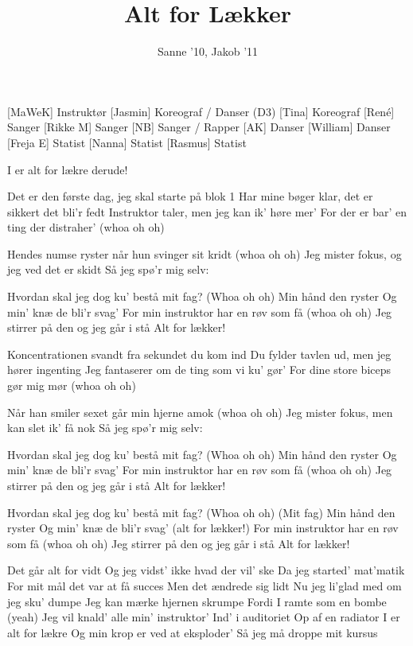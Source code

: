 \documentclass[a4paper,11pt]{article}
\title{Alt for Lækker}
\author{Sanne '10, Jakob '11}
\begin{document}
\maketitle

\begin{roles}
[MaWeK] Instruktør
[Jasmin] Koreograf / Danser (D3)
[Tina] Koreograf
[René] Sanger
[Rikke M] Sanger
[NB] Sanger / Rapper
[AK] Danser
[William] Danser
[Freja E] Statist
[Nanna] Statist
[Rasmus] Statist
\end{roles}

\begin{song}
 I er alt for lækre derude!

 Det er den første dag, jeg skal starte på blok 1
Har mine bøger klar, det er sikkert det bli'r fedt
Instruktor taler, men jeg kan ik' høre mer'
For der er bar' en ting der distraher' (whoa oh oh)

 Hendes numse ryster når hun svinger sit kridt (whoa oh oh)
Jeg mister fokus, og jeg ved det er skidt
Så jeg spø'r mig selv:

 Hvordan skal jeg dog ku' bestå mit fag? (Whoa oh oh)
Min hånd den ryster
Og min' knæ de bli'r svag'
For min instruktor har en røv som få (whoa oh oh)
Jeg stirrer på den og jeg går i stå
 Alt for lækker!

 Koncentrationen svandt fra sekundet du kom ind
Du fylder tavlen ud, men jeg hører ingenting
Jeg fantaserer om de ting som vi ku' gør'
For dine store biceps gør mig mør (whoa oh oh)

 Når han smiler sexet går min hjerne amok (whoa oh oh)
Jeg mister fokus, men kan slet ik' få nok
Så jeg spø'r mig selv:

 Hvordan skal jeg dog ku' bestå mit fag? (Whoa oh oh)
Min hånd den ryster
Og min' knæ de bli'r svag'
For min instruktor har en røv som få (whoa oh oh)
Jeg stirrer på den og jeg går i stå
 Alt for lækker!

 Hvordan skal jeg dog ku' bestå mit fag? (Whoa oh oh)
 (Mit fag)
 Min hånd den ryster
Og min' knæ de bli'r svag' (alt for lækker!)
For min instruktor har en røv som få (whoa oh oh)
Jeg stirrer på den og jeg går i stå
Alt for lækker!

 Det går alt for vidt
Og jeg vidst' ikke hvad der vil' ske
Da jeg started' mat'matik
For mit mål det var at få succes
Men det ændrede sig lidt
Nu jeg li'glad med om jeg sku' dumpe
Jeg kan mærke hjernen skrumpe
Fordi I ramte som en bombe (yeah)
Jeg vil knald' alle min' instruktor'
Ind' i auditoriet
Op af en radiator
I er alt for lækre
Og min krop er ved at eksploder'
Så jeg må droppe mit kursus


\end{song}
\end{document}
